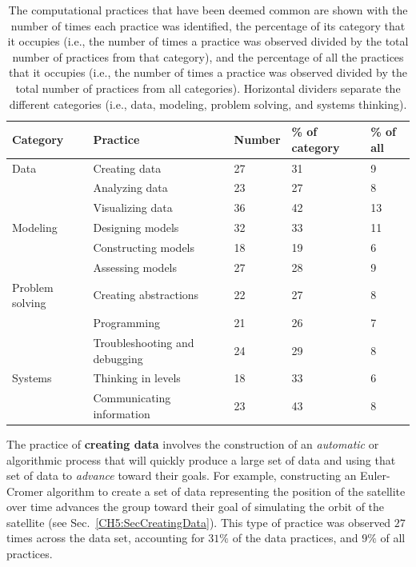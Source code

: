 \documentclass{msuphddissertation}
\begin{document}
\begin{doublespace}
\begin{table}[hb]\centering
\begin{tabular}{lllll}\hline\hline
Category & Practice & Number & \% of category & \% of all\\\hline
Data & Creating data & 27 & 31 & 9 \\
 & Analyzing data & 23 & 27 & 8 \\
 & Visualizing data & 36 & 42 & 13 \\\hline
Modeling & Designing models & 32 & 33 & 11 \\
 & Constructing models & 18 & 19 & 6 \\
 & Assessing models & 27 & 28 & 9\\\hline
Problem solving & Creating abstractions & 22 & 27 & 8 \\
 & Programming & 21 & 26 & 7 \\
 & Troubleshooting and debugging & 24 & 29 & 8 \\\hline
Systems & Thinking in levels & 18 & 33 & 6 \\
 & Communicating information & 23 & 43 & 8 \\\hline\hline
\end{tabular}
\caption{The computational practices that have been deemed common are shown with the number of times each practice was identified, the percentage of its category that it occupies (i.e., the number of times a practice was observed divided by the total number of practices from that category), and the percentage of all the practices that it occupies (i.e., the number of times a practice was observed divided by the total number of practices from all categories).  Horizontal dividers separate the different categories (i.e., data, modeling, problem solving, and systems thinking).}\label{CH6:Common}
\end{table}

%
%
%

The practice of \textbf{creating data} involves the construction of an \textit{automatic} or algorithmic process that will quickly produce a large set of data and using that set of data to \textit{advance} toward their goals.  For example, constructing an Euler-Cromer algorithm to create a set of data representing the position of the satellite over time advances the group toward their goal of simulating the orbit of the satellite (see Sec.~\ref{CH5:SecCreatingData}).  This type of practice was observed $27$ times across the data set, accounting for $31\%$ of the data practices, and $9\%$ of all practices.


\end{doublespace}
\end{document}
